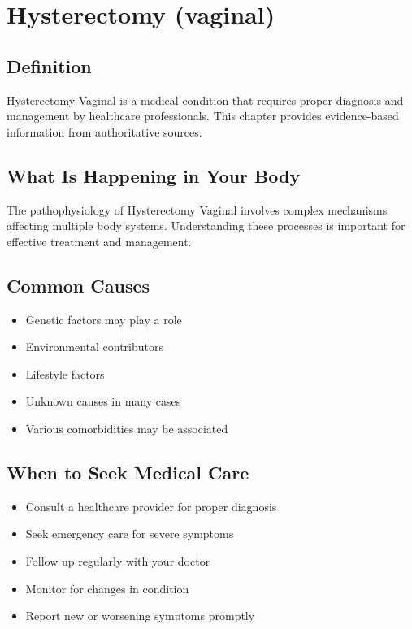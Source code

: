 
\chapter{Hysterectomy (vaginal)}

\section*{Definition}
Hysterectomy Vaginal is a medical condition that requires proper diagnosis and management by healthcare professionals. This chapter provides evidence-based information from authoritative sources.

\section*{What Is Happening in Your Body}
The pathophysiology of Hysterectomy Vaginal involves complex mechanisms affecting multiple body systems. Understanding these processes is important for effective treatment and management.

\section*{Common Causes}
\begin{itemize}
  \item Genetic factors may play a role
  \item Environmental contributors
  \item Lifestyle factors
  \item Unknown causes in many cases
  \item Various comorbidities may be associated
\end{itemize}

\section*{When to Seek Medical Care}
\begin{itemize}
  \item Consult a healthcare provider for proper diagnosis
  \item Seek emergency care for severe symptoms
  \item Follow up regularly with your doctor
  \item Monitor for changes in condition
  \item Report new or worsening symptoms promptly
\end{itemize}

